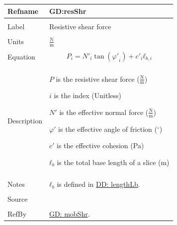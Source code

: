 \documentclass[12pt]{article}
\begin{document}
\noindent \begin{minipage}{\textwidth}
\begin{tabular}{p{} p{}}
\toprule \textbf{Refname} & \textbf{GD:resShr}
\label{GD:resShr}
\\ \midrule \\
Label & Resistive shear force
        \\ \midrule \\
        Units & $\frac{\text{N}}{\text{m}}$
                \\ \midrule \\
                Equation & \begin{displaymath}
                           P_{i}={N'}_{i} \tan\left({φ'}_{i}\right)+{c'}_{i} {ℓ_{b,i}}
                           \end{displaymath}
                           \\ \midrule \\
                           Description & \begin{symbDescription}
                                         \item{$P$ is the resistive shear force ($\frac{\text{N}}{\text{m}}$)}
                                         \item{$i$ is the index (Unitless)}
                                         \item{$N'$ is the effective normal force ($\frac{\text{N}}{\text{m}}$)}
                                         \item{$φ'$ is the effective angle of friction (${}^{\circ}$)}
                                         \item{$c'$ is the effective cohesion (Pa)}
                                         \item{${ℓ_{b}}$ is the total base length of a slice (m)}
                                         \end{symbDescription}
                                         \\ \midrule \\
                                         Notes & ${ℓ_{b}}$ is defined in \hyperref[DD:lengthLb]{DD: lengthLb}.
                                                 \\ \midrule \\
                                                 Source & \cite{chen2005}
                                                          \\ \midrule \\
                                                          RefBy & \hyperref[GD:mobShr]{GD: mobShr}.
\\ \bottomrule \end{tabular}
\end{minipage}
\end{document}
